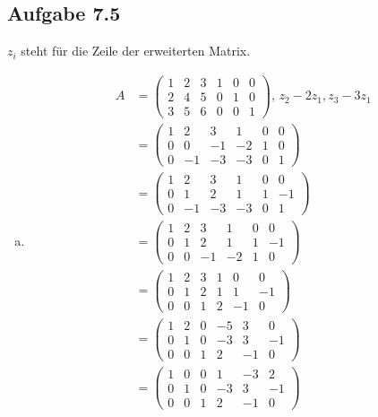 \documentclass{standalone}
\begin{document}
\subsection{Aufgabe 7.5}
$z_i$ steht für die Zeile der erweiterten Matrix.
\begin{enumerate}[a)]
    \item \begin{align}
        A &= \left(\begin{array}{ccc|ccc}
            1 & 2 & 3 & 1 & 0 & 0\\
            2 & 4 & 5 & 0 & 1 & 0\\
            3 & 5 & 6 & 0 & 0 & 1
        \end{array}\right) \text{, } z_2 - 2z_1, z_3 - 3z_1\\
        &= \left(\begin{array}{ccc|ccc}
            1 & 2 & 3 & 1 & 0 & 0\\
            0 & 0 & -1 & -2 & 1 & 0\\
            0 & -1 & -3 & -3 & 0 & 1
        \end{array}\right) \\
        &= \left(\begin{array}{ccc|ccc}
            1 & 2 & 3 & 1 & 0 & 0\\
            0 & 1 & 2 & 1 & 1 & -1\\
            0 & -1 & -3 & -3 & 0 & 1
        \end{array}\right) \\
        &= \left(\begin{array}{ccc|ccc}
            1 & 2 & 3 & 1 & 0 & 0\\
            0 & 1 & 2 & 1 & 1 & -1\\
            0 & 0 & -1 & -2 & 1 & 0
        \end{array}\right) \\
        &= \left(\begin{array}{ccc|ccc}
            1 & 2 & 3 & 1 & 0 & 0\\
            0 & 1 & 2 & 1 & 1 & -1\\
            0 & 0 & 1 & 2 & -1 & 0
        \end{array}\right) \\
        &= \left(\begin{array}{ccc|ccc}
            1 & 2 & 0 & -5 & 3 & 0\\
            0 & 1 & 0 & -3 & 3 & -1\\
            0 & 0 & 1 & 2 & -1 & 0
        \end{array}\right) \\
        &= \left(\begin{array}{ccc|ccc}
            1 & 0 & 0 & 1 & -3 & 2\\
            0 & 1 & 0 & -3 & 3 & -1\\
            0 & 0 & 1 & 2 & -1 & 0
        \end{array}\right)
    \end{align}
    

\end{enumerate}
\end{document}
